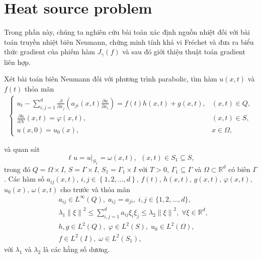 \documentclass[]{article}
\begin{document}
\newpage
\section{Heat source problem}
\qquad Trong phần này, chúng ta nghiên cứu bài toán xác định nguồn nhiệt đối với  bài toán truyền nhiệt biên Neumann, chứng minh tính khả vi Fréchet và đưa ra biểu thức gradient của phiếm hàm $J_\gamma(f)$ và sau đó giới thiệu thuật toán gradient liên hợp.

\begin{dn}\label{dn3.1}
	Xét bài toán biên Neumann đối với phương trình parabolic, tìm hàm $u(x, t)$ và $f(t)$ thỏa mãn
	\begin{align}\label{3.1}
		\begin{cases}
			u_t-\sum_{i, j=1}^{d}\frac{\partial}{\partial x_j}\left(a_{ji}(x, t)\frac{\partial u}{\partial x_i}\right)=f(t)h(x, t)+g(x, t), & (x, t)\in Q,\\
			\frac{\partial u}{\partial \mathcal{N}}(x, t)=\varphi(x, t), & (x, t)\in S,\\
			u(x, 0)=u_0(x), & x\in \Omega,
		\end{cases}
	\end{align}
\end{dn}
\noindent và quan sát
$$\ell u = u|_{S_1}=\omega(x, t),\,\; (x, t) \in S_1\subseteq S,$$
trong đó $Q = \Omega\times I$, $S=\Gamma\times I$, $S_1=\Gamma_1\times I$ với $T>0$, $\Gamma_1\subseteq \Gamma$ và $\Omega\subset \mathbb{R}^d$ có biên $\Gamma$. Các hàm số $a_{ij}(x, t),\, i, j\in \left\{1, 2, ..., d\right\},\, f(t),\, h(x, t),\, g(x, t), \,\varphi(x, t),$ $ u_0(x),\, \omega(x, t)$ cho trước và thỏa mãn
\begin{align*}
	&a_{ij}\in L^{\infty}(Q), \;a_{ij}=a_{ji},\; i, j\in \{1, 2, ..., d\},\\
	&\lambda_1\left\|\xi\right\|^2\leq \sum_{i, j=1}^{d}a_{ij}\xi_i\xi_j\leq \lambda_2\left\|\xi\right\|^2,\; \forall \xi\in\mathbb{R}^d,\\
	&h, g \in L^2(Q), \; \varphi\in L^2(S), \; u_0\in L^2(\Omega),\\ 
	& f\in L^2(I),\; \omega\in L^2(S_1),
\end{align*}
với $\lambda_1$ và $\lambda_2$ là các hằng số dương.
\end{document}
